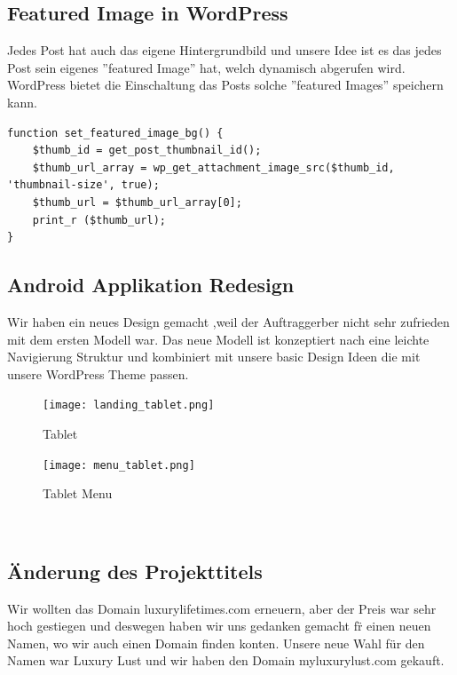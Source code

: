 \newpage
\subsection{Featured Image in WordPress}
Jedes Post hat auch das eigene Hintergrundbild und unsere Idee ist es das jedes Post sein eigenes ''featured Image'' hat, welch dynamisch abgerufen wird. WordPress bietet die Einschaltung das Posts solche ''featured Images'' speichern kann. 
\begin{verbatim}
function set_featured_image_bg() {
	$thumb_id = get_post_thumbnail_id();
	$thumb_url_array = wp_get_attachment_image_src($thumb_id, 'thumbnail-size', true);
	$thumb_url = $thumb_url_array[0];
	print_r ($thumb_url);
}
\end{verbatim}
\newpage
\subsection{Android Applikation Redesign}
Wir haben ein neues Design gemacht ,weil der Auftraggerber nicht sehr zufrieden mit dem ersten Modell war.
Das neue Modell ist konzeptiert nach eine leichte Navigierung Struktur und kombiniert mit unsere basic Design Ideen die mit unsere WordPress Theme passen.

\begin{figure}[!h]
  \texttt{[image: landing\_tablet.png]}
  \caption{Tablet}
  \label{fig:tablet}
\end{figure}

\begin{figure}[!h]
  \texttt{[image: menu\_tablet.png]}
  \caption{Tablet Menu}
  \label{fig:tabletmenu}
\end{figure}

\begin{figure}[!h]
\\
\end{figure}

\subsection{\"Anderung des Projekttitels}
Wir wollten das Domain luxurylifetimes.com erneuern, aber der Preis war sehr hoch gestiegen und deswegen haben wir uns gedanken gemacht f\"r einen neuen Namen, wo wir auch einen Domain finden konten. Unsere neue Wahl f\"ur den Namen war Luxury Lust und wir haben den Domain myluxurylust.com gekauft.

